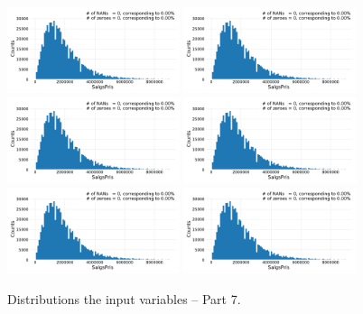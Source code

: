 \begin{figure}
  \subfloat{\qquad}
  \includegraphics[draft=false, width=0.45\textwidth, page=79, trim=15 0 15 0, clip]{figures/housing/overview_fig.pdf}\hfil
  \subfloat{\qquad}
  \includegraphics[draft=false, width=0.45\textwidth, page=80, trim=15 0 15 0, clip]{figures/housing/overview_fig.pdf}
  \subfloat{\qquad}
  \includegraphics[draft=false, width=0.45\textwidth, page=81, trim=15 0 15 0, clip]{figures/housing/overview_fig.pdf}\hfil
  \subfloat{\qquad}
  \includegraphics[draft=false, width=0.45\textwidth, page=82, trim=15 0 15 0, clip]{figures/housing/overview_fig.pdf}
  \subfloat{\qquad}
  \includegraphics[draft=false, width=0.45\textwidth, page=83, trim=15 0 15 0, clip]{figures/housing/overview_fig.pdf}\hfil
  \subfloat{\qquad}
  \includegraphics[draft=false, width=0.45\textwidth, page=84, trim=15 0 15 0, clip]{figures/housing/overview_fig.pdf}
  \caption[Distributions of the Input Variables -- Part 7]{Distributions the input variables -- Part 7.}
  \label{fig:h:variable_overview_all_7}
  \vspace{\abovecaptionskip}
\end{figure}

